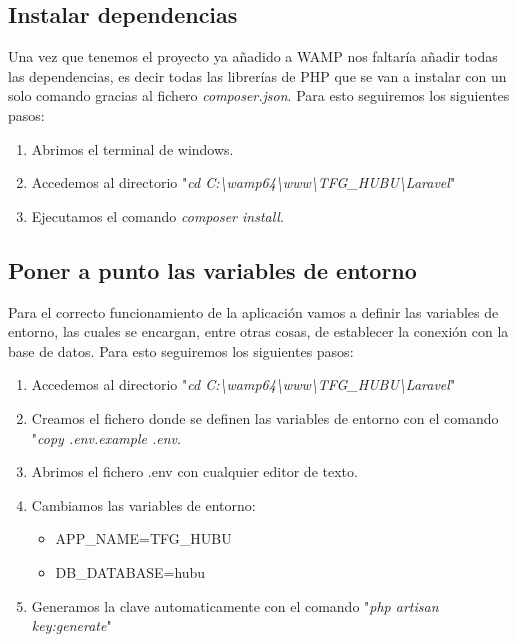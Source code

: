 \subsection{Instalar dependencias}

Una vez que tenemos el proyecto ya añadido a WAMP nos faltaría añadir todas las dependencias, es decir todas las librerías de PHP que se van a instalar con un solo comando gracias al fichero \textit{composer.json}. Para esto seguiremos los siguientes pasos:

\begin{enumerate}
    \item Abrimos el terminal de windows.
    \item Accedemos al directorio "\textit{cd C:\textbackslash{}wamp64\textbackslash{}www\textbackslash{}TFG\_HUBU\textbackslash{}Laravel}"
    \item Ejecutamos el comando \textit{composer install}.
\end{enumerate}

\subsection{Poner a punto las variables de entorno}

Para el correcto funcionamiento de la aplicación vamos a definir las variables de entorno, las cuales se encargan, entre otras cosas, de establecer la conexión con la base de datos. Para esto seguiremos los siguientes pasos:

\begin{enumerate}
    \item Accedemos al directorio "\textit{cd C:\textbackslash{}wamp64\textbackslash{}www\textbackslash{}TFG\_HUBU\textbackslash{}Laravel}"
    \item Creamos el fichero donde se definen las variables de entorno con el comando "\textit{copy .env.example .env}.
    \item Abrimos el fichero .env con cualquier editor de texto.
    \item Cambiamos las variables de entorno:
    \begin{itemize}
        \item APP\_NAME=TFG\_HUBU
        \item DB\_DATABASE=hubu
    \end{itemize}
    \item Generamos la clave automaticamente con el comando "\textit{php artisan key:generate}"
\end{enumerate}

